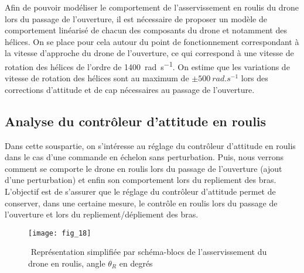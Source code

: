 Afin de pouvoir modéliser le comportement de l’asservissement en roulis du drone lors du
passage de l’ouverture, il est nécessaire de proposer un modèle de comportement linéarisé
de chacun des composants du drone et notamment des hélices. On se place pour cela autour
du point de fonctionnement correspondant à la vitesse d’approche du drone de l’ouverture,
ce qui correspond à une vitesse de rotation des hélices de l’ordre de \SI{1400}{rad.s^{-1}}. On estime
que les variations de vitesse de rotation des hélices sont au maximum de $\pm \SI{500}{rad.s^{-1}}$ lors
des corrections d’attitude et de cap nécessaires au passage de l’ouverture.

\ifprof
\begin{corrige}
\end{corrige}
\else
\fi

\subsection{Analyse du contrôleur d’attitude en roulis}

Dans cette sous­partie, on s’intéresse au réglage du contrôleur d’attitude en roulis dans le
cas d’une commande en échelon sans perturbation. Puis, nous verrons comment se comporte le drone en roulis lors du passage de l’ouverture (ajout d’une perturbation) et enfin
son comportement lors du repliement des bras. L’objectif est de s’assurer que le réglage du
contrôleur d’attitude permet de conserver, dans une certaine mesure, le contrôle en roulis
lors du passage de l’ouverture et lors du repliement/dépliement des bras.

\begin{figure}[H]
\centering
\texttt{[image: fig\_18]}
\caption{\label{fig:18} ­ Représentation simplifiée par schéma-blocs de l’asservissement du drone en
roulis, angle $\theta_R$ en degrés}
\end{figure}

